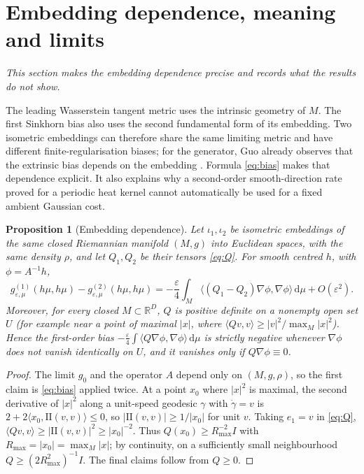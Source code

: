 \documentclass[11pt,a4paper]{article}
\newtheorem{proposition}[theorem]{Proposition}
\theoremstyle{definition}\newtheorem{definition}[theorem]{Definition}
\theoremstyle{remark}\newtheorem{remark}[theorem]{Remark}
\newcommand{\eps}{\varepsilon}
\newcommand{\dd}{\,\mathrm d}
\newcommand{\R}{\mathbb R}
\newcommand{\II}{\mathrm{II}}
\begin{document}
\section{Embedding dependence, meaning and limits}\label{sec:meaning}

\noindent\emph{This section makes the embedding dependence precise and records what the results do not show.}

The leading Wasserstein tangent metric uses the intrinsic geometry of $M$. The first Sinkhorn bias also uses the second fundamental form of its embedding. Two isometric embeddings can therefore share the same limiting metric and have different finite-regularisation biases; for the generator, Guo already observes that the extrinsic bias depends on the embedding \cite{Guo}. Formula \eqref{eq:bias} makes that dependence explicit. It also explains why a second-order smooth-direction rate proved for a periodic heat kernel cannot automatically be used for a fixed ambient Gaussian cost.

\begin{proposition}[Embedding dependence]\label{prop:embedding}
Let $\iota_1,\iota_2$ be isometric embeddings of the same closed Riemannian manifold $(M,g)$ into Euclidean spaces, with the same density $\rho$, and let $Q_1,Q_2$ be their tensors \eqref{eq:Q}. For smooth centred $h$, with $\phi=A^{-1}h$,
\[
g^{(1)}_{\eps,\mu}(h\mu,h\mu)-g^{(2)}_{\eps,\mu}(h\mu,h\mu)
=-\frac\eps4\int_M\langle(Q_1-Q_2)\nabla\phi,\nabla\phi\rangle\dd\mu+O(\eps^2).
\]
Moreover, for every closed $M\subset\R^D$, $Q$ is positive definite on a nonempty open set $U$ (for example near a point of maximal $|x|$, where $\langle Qv,v\rangle\ge|v|^2/\max_M|x|^2$). Hence the first-order bias $-\tfrac\eps4\int\langle Q\nabla\phi,\nabla\phi\rangle\dd\mu$ is strictly negative whenever $\nabla\phi$ does not vanish identically on $U$, and it vanishes only if $Q\nabla\phi\equiv0$.
\end{proposition}
\begin{proof}
The limit $g_0$ and the operator $A$ depend only on $(M,g,\rho)$, so the first claim is \eqref{eq:bias} applied twice. At a point $x_0$ where $|x|^2$ is maximal, the second derivative of $|x|^2$ along a unit-speed geodesic $\gamma$ with $\dot\gamma=v$ is $2+2\langle x_0,\II(v,v)\rangle\le0$, so $|\II(v,v)|\ge1/|x_0|$ for unit $v$. Taking $e_1=v$ in \eqref{eq:Q}, $\langle Qv,v\rangle\ge|\II(v,v)|^2\ge|x_0|^{-2}$. Thus $Q(x_0)\ge R_{\max}^{-2}I$ with $R_{\max}=|x_0|=\max_M|x|$; by continuity, on a sufficiently small neighbourhood $Q\ge(2R_{\max}^2)^{-1}I$. The final claims follow from $Q\ge0$.
\end{proof}
\end{document}
